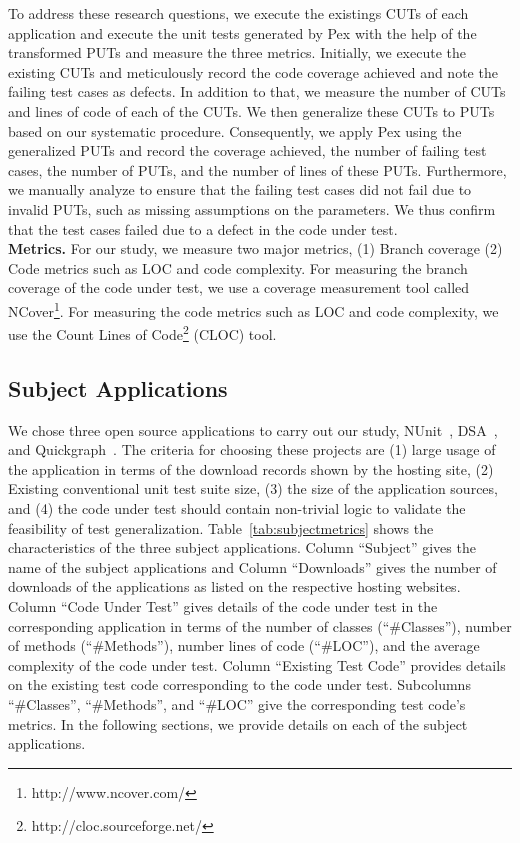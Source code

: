 To address these research questions, we execute the existings CUTs of each application and execute the unit tests generated by Pex with the help of the transformed PUTs and measure the three metrics. Initially, we execute the existing CUTs and meticulously record the code coverage achieved and note the failing test cases as defects. In addition to that, we measure the number of CUTs and lines of code of each of the CUTs. We then generalize these CUTs to PUTs based on our systematic procedure. Consequently, we apply Pex using the generalized PUTs and record the coverage achieved, the number of failing test cases, the number of PUTs, and the number of lines of these PUTs. Furthermore, we manually analyze to ensure that the failing test cases did not fail due to invalid PUTs, such as missing assumptions on the parameters. We thus confirm that the test cases failed due to a defect in the code under test. \\

\noindent\textbf{Metrics.}
For our study, we measure two major metrics, (1) Branch coverage (2) Code metrics such as LOC and code complexity. For measuring the branch coverage of the code under test, we use a coverage measurement tool called NCover\footnote{http://www.ncover.com/}. For measuring the code metrics such as LOC and code complexity, we use the Count Lines of Code\footnote{http://cloc.sourceforge.net/} (CLOC) tool.

\subsection{Subject Applications}

We chose three open source applications to carry out our study, NUnit~\cite{nunit}, DSA~\cite{dsa}, and Quickgraph~\cite{quickgraph}. The criteria for choosing these projects are (1) large usage of the application in terms of the download records shown by the hosting site, (2) Existing conventional unit test suite size, (3) the size of the application sources, and (4) the code under test should contain non-trivial logic to validate the feasibility of test generalization. Table~\ref{tab:subjectmetrics} shows the characteristics of the three subject applications. Column ``Subject'' gives the name of the subject applications and Column ``Downloads'' gives the number of downloads of the applications as listed on the respective hosting websites. Column ``Code Under Test'' gives details of the code under test in the corresponding application in terms of the number of classes (``\#Classes''), number of methods (``\#Methods''), number lines of code (``\#LOC''), and the average complexity of the code under test. Column ``Existing Test Code'' provides details on the existing test code corresponding to the code under test. Subcolumns ``\#Classes'', ``\#Methods'', and ``\#LOC'' give the corresponding test code's metrics. In the following sections, we provide details on each of the subject applications.

